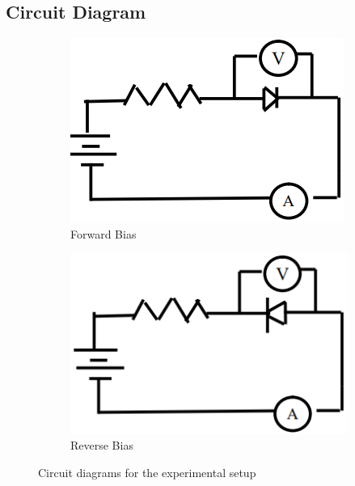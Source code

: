 \subsection{Circuit Diagram}
\begin{figure}[H]
     \centering
     \begin{subfigure}[b]{0.2\textwidth}
         \centering
         \includegraphics[width=\textwidth]{images/d6.png}
         \caption{Forward Bias}
     \end{subfigure}
     \hfill
     \begin{subfigure}[b]{0.2\textwidth}
         \centering
         \includegraphics[width=\textwidth]{images/d7.png}
         \caption{Reverse Bias}
     \end{subfigure}
     \hfill
        \caption{Circuit diagrams for the experimental setup}
\end{figure}